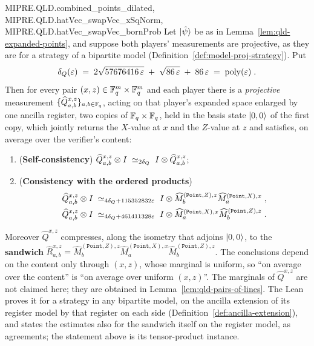 \begin{lemma}
{  MIPRE.QLD.combined_points_dilated, MIPRE.QLD.hatVec_swapVec_xSqNorm,
  MIPRE.QLD.hatVec_swapVec_bornProb}
\leanok
Let $|\hat\psi\rangle$ be as in Lemma~\ref{lem:qld-expanded-points}, and suppose both players'
measurements are projective, as they are for a strategy of a bipartite model
(Definition~\ref{def:model-proj-strategy}). Put
\begin{equation*}
  \delta_Q(\varepsilon) \;=\; 2\sqrt{57676416\,\varepsilon} \;+\; \sqrt{86\,\varepsilon} \;+\; 86\,\varepsilon
  \;=\; \mathrm{poly}(\varepsilon)\;.
\end{equation*}
Then for every pair $(x, z) \in \mathbb{F}_q^m \times \mathbb{F}_q^m$ and each player there is a \emph{projective}
measurement $\{\widehat{Q}^{x, z}_{a, b}\}_{a, b \in \mathbb{F}_q}$, acting on that player's expanded space
enlarged by one ancilla register, two copies of $\mathbb{F}_q \times \mathbb{F}_q$, held in the basis state
$|0, 0\rangle$ of the first copy, which jointly returns the $X$-value at $x$ and the $Z$-value at $z$
and satisfies, on average over the verifier's content:
\begin{enumerate}
\item (\textbf{Self-consistency})
  $\widehat{Q}^{x, z}_{a, b} \otimes I \;\simeq_{2 \delta_Q}\; I \otimes \widehat{Q}^{x, z}_{a, b}$;
\item (\textbf{Consistency with the ordered products})
  \begin{gather*}
    \widehat{Q}^{x, z}_{a, b} \otimes I \;\simeq_{4 \delta_Q + 115352832 \varepsilon}\;
      I \otimes \widehat{M}^{(\mathtt{Point}, Z), z}_b \widehat{M}^{(\mathtt{Point}, X), x}_a\;, \\
    \widehat{Q}^{x, z}_{a, b} \otimes I \;\simeq_{4 \delta_Q + 461411328 \varepsilon}\;
      I \otimes \widehat{M}^{(\mathtt{Point}, X), x}_a \widehat{M}^{(\mathtt{Point}, Z), z}_b\;.
  \end{gather*}
\end{enumerate}
Moreover $\widehat{Q}^{x, z}$ compresses, along the isometry that adjoins $|0, 0\rangle$, to the
\textbf{sandwich}
$\widehat{R}^{x, z}_{a, b} = \widehat{M}^{(\mathtt{Point}, Z), z}_b
\widehat{M}^{(\mathtt{Point}, X), x}_a \widehat{M}^{(\mathtt{Point}, Z), z}_b$. The conclusions
depend on the content only through $(x, z)$, whose marginal is uniform, so ``on average over the
content'' is ``on average over uniform $(x, z)$''. The marginals of $\widehat{Q}^{x,z}$ are not
claimed here; they are obtained in Lemma~\ref{lem:qld-pairs-of-lines}.
The Lean proves it for a strategy in any bipartite model, on the ancilla extension of its register
model by that register on each side (Definition~\ref{def:ancilla-extension}), and states the
estimates also for the sandwich itself on the register model, as agreements; the statement above
is its tensor-product instance.
\end{lemma}

